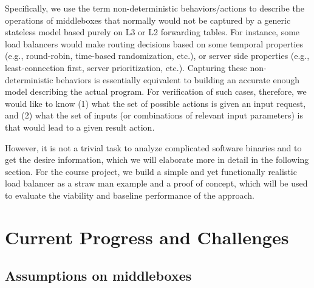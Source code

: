 Specifically, we use the term non-deterministic behaviors/actions to describe
the operations of middleboxes that normally would not be captured by a generic
stateless model based purely on L3 or L2 forwarding tables. For instance, some
load balancers would make routing decisions based on some temporal properties
(e.g., round-robin, time-based randomization, etc.), or server side properties
(e.g., least-connection first, server prioritization, etc.). Capturing these
non-deterministic behaviors is essentially equivalent to building an accurate
enough model describing the actual program. For verification of such cases,
therefore, we would like to know (1) what the set of possible actions is given
an input request, and (2) what the set of inputs (or combinations of relevant
input parameters) is that would lead to a given result action.

However, it is not a trivial task to analyze complicated software binaries and
to get the desire information, which we will elaborate more in detail in the
following section. For the course project, we build a simple and yet
functionally realistic load balancer as a straw man example and a proof of
concept, which will be used to evaluate the viability and baseline performance
of the approach.


\section{Current Progress and Challenges}

\subsection{Assumptions on middleboxes}

